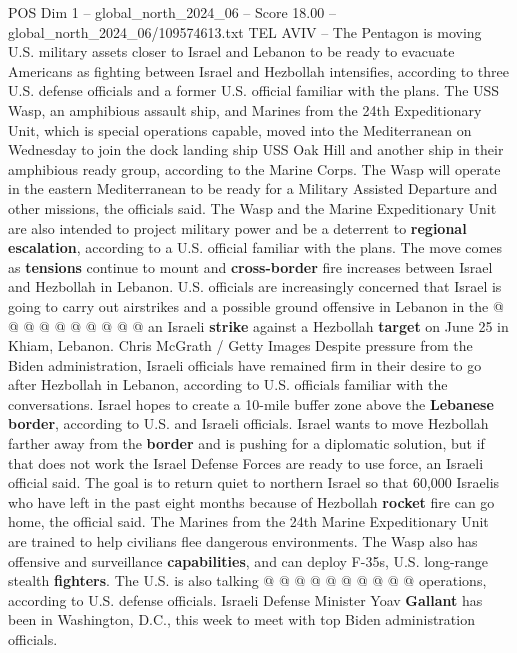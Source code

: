 \begin{textsample}{POS Dim 1 – global\_north\_2024\_06 – Score 18.00 – global\_north\_2024\_06/109574613.txt}  \label{ex:f1_pos_319}
TEL AVIV -- The Pentagon is moving U.S. military assets closer to Israel and Lebanon to be ready to evacuate Americans as fighting between Israel and Hezbollah intensifies, according to three U.S. defense officials and a former U.S. official familiar with the plans.
The USS Wasp, an amphibious assault ship, and Marines from the 24th Expeditionary Unit, which is special operations capable, moved into the Mediterranean on Wednesday to join the dock landing ship USS Oak Hill and another ship in their amphibious ready group, according to the Marine Corps.
The Wasp will operate in the eastern Mediterranean to be ready for a Military Assisted Departure and other missions, the officials said.
The Wasp and the Marine Expeditionary Unit are also intended to project military power and be a deterrent to \textbf{regional} \textbf{escalation}, according to a U.S. official familiar with the plans.
The move comes as \textbf{tensions} continue to mount and \textbf{cross-border} fire increases between Israel and Hezbollah in Lebanon.
U.S. officials are increasingly concerned that Israel is going to carry out airstrikes and a possible ground offensive in Lebanon in the @ @ @ @ @ @ @ @ @ @ an Israeli \textbf{strike} against a Hezbollah \textbf{target} on June 25 in Khiam, Lebanon.
Chris McGrath / Getty Images Despite pressure from the Biden administration, Israeli officials have remained firm in their desire to go after Hezbollah in Lebanon, according to U.S. officials familiar with the conversations.
Israel hopes to create a 10-mile buffer zone above the \textbf{Lebanese} \textbf{border}, according to U.S. and Israeli officials.
Israel wants to move Hezbollah farther away from the \textbf{border} and is pushing for a diplomatic solution, but if that does not work the Israel Defense Forces are ready to use force, an Israeli official said.
The goal is to return quiet to northern Israel so that 60,000 Israelis who have left in the past eight months because of Hezbollah \textbf{rocket} fire can go home, the official said.
The Marines from the 24th Marine Expeditionary Unit are trained to help civilians flee dangerous environments.
The Wasp also has offensive and surveillance \textbf{capabilities}, and can deploy F-35s, U.S. long-range stealth \textbf{fighters}.
The U.S. is also talking @ @ @ @ @ @ @ @ @ @ operations, according to U.S. defense officials.
Israeli Defense Minister Yoav \textbf{Gallant} has been in Washington, D.C., this week to meet with top Biden administration officials.

\end{textsample}
